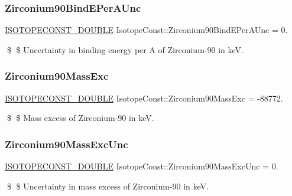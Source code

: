 \subsubsection{\texorpdfstring{Zirconium90\+Bind\+E\+Per\+A\+Unc}{Zirconium90BindEPerAUnc}}
{\footnotesize\ttfamily \mbox{\hyperlink{group___isotope_const-_macros_ga8f45a7272ce02c0b4c65c44636ed719a}{I\+S\+O\+T\+O\+P\+E\+C\+O\+N\+S\+T\+\_\+\+D\+O\+U\+B\+LE}} Isotope\+Const\+::\+Zirconium90\+Bind\+E\+Per\+A\+Unc = 0.}

\$ \$ Uncertainty in binding energy per A of Zirconium-\/90 in keV. \mbox{\label{group___isotope_const-_zirconium-_zr90_ga14fd593c1bba644e1fb81f5d85374199}} 
\subsubsection{\texorpdfstring{Zirconium90\+Mass\+Exc}{Zirconium90MassExc}}
{\footnotesize\ttfamily \mbox{\hyperlink{group___isotope_const-_macros_ga8f45a7272ce02c0b4c65c44636ed719a}{I\+S\+O\+T\+O\+P\+E\+C\+O\+N\+S\+T\+\_\+\+D\+O\+U\+B\+LE}} Isotope\+Const\+::\+Zirconium90\+Mass\+Exc = -\/88772.}

\$ \$ Mass excess of Zirconium-\/90 in keV. \mbox{\label{group___isotope_const-_zirconium-_zr90_gae3cbe034551b8d8e2193c200f24399cf}} 
\subsubsection{\texorpdfstring{Zirconium90\+Mass\+Exc\+Unc}{Zirconium90MassExcUnc}}
{\footnotesize\ttfamily \mbox{\hyperlink{group___isotope_const-_macros_ga8f45a7272ce02c0b4c65c44636ed719a}{I\+S\+O\+T\+O\+P\+E\+C\+O\+N\+S\+T\+\_\+\+D\+O\+U\+B\+LE}} Isotope\+Const\+::\+Zirconium90\+Mass\+Exc\+Unc = 0.}

\$ \$ Uncertainty in mass excess of Zirconium-\/90 in keV. \mbox{\label{group___isotope_const-_zirconium-_zr90_ga5bdf60babddbbad275d8894ef6e98b9b}} 
